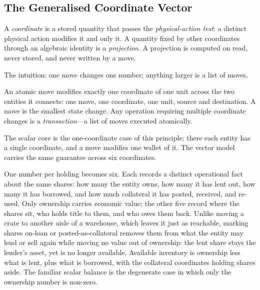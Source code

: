 \subsection{The Generalised Coordinate Vector}
\label{sec:position-vector}

A \emph{coordinate} is a stored quantity that passes the \emph{physical-action test}: a distinct physical action modifies it and only it. A quantity fixed by other coordinates through an algebraic identity is a \emph{projection}. A projection is computed on read, never stored, and never written by a move.

The intuition: one move changes one number; anything larger is a list of moves.

\begin{principle}
\label{princ:single-coord}
An atomic move modifies exactly one coordinate of one unit across the two entities it connects: one move, one coordinate, one unit, source and destination. A move is the smallest state change. Any operation requiring multiple coordinate changes is a \emph{transaction}---a list of moves executed atomically.
\end{principle}

The scalar core is the one-coordinate case of this principle: there each entity has a single coordinate, and a move modifies one wallet of it. The vector model carries the same guarantee across six coordinates.

\begin{mentalmodel}
One number per holding becomes six. Each records a distinct operational fact about the same shares: how many the entity owns, how many it has lent out, how many it has borrowed, and how much collateral it has posted, received, and re-used. Only ownership carries economic value; the other five record where the shares sit, who holds title to them, and who owes them back. Unlike moving a crate to another aisle of a warehouse, which leaves it just as reachable, marking shares on-loan or posted-as-collateral removes them from what the entity may lend or sell again while moving no value out of ownership: the lent share stays the lender's asset, yet is no longer available. Available inventory is ownership less what is lent, plus what is borrowed, with the collateral coordinates holding shares aside. The familiar scalar balance is the degenerate case in which only the ownership number is non-zero.
\end{mentalmodel}

